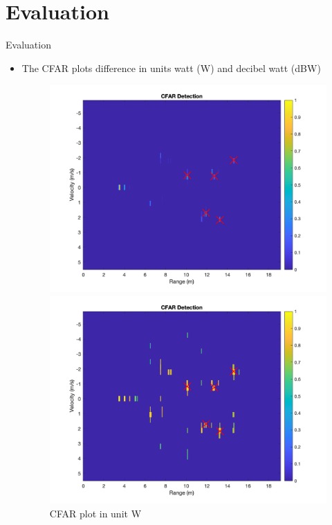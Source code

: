\documentclass{beamer}
\newcounter{section}
\begin{document}
\section{Evaluation}
\setcounter{section}{5}
\setcounter{figure}{0}

\begin{frame}[t]{Evaluation}
	\begin{itemize}
	    \item The CFAR plots difference in units watt (W) and decibel watt (dBW)
        \vspace{0.5\baselineskip}
            \begin{figure}
                \centering
                \begin{minipage}{0.45\textwidth}
                    \centering
                    \includegraphics[height=0.8\textwidth]{figures/1c_empty.png}
                    \caption{CFAR plot in unit W}
                \end{minipage}
                \begin{minipage}{0.45\textwidth}
                    \centering
                    \includegraphics[height=0.8\textwidth]{figures/1c_empty_dBW.png}

\end{minipage}
\end{figure}
\end{itemize}
\end{frame}
\end{document}
